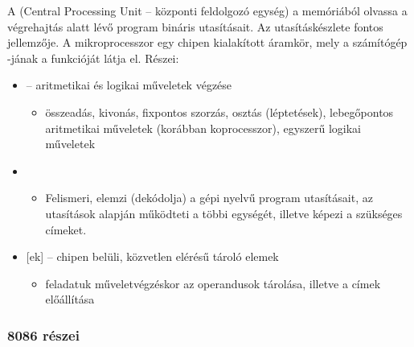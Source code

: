 \documentclass[../main.tex]{subfiles}
\begin{document}
A  (Central Processing Unit -- központi feldolgozó egység) a
memóriából olvassa a végrehajtás alatt lévő program bináris utasításait.
Az utasításkészlete fontos jellemzője. A mikroprocesszor egy chipen kialakított
áramkör, mely a számítógép -jának a funkcióját látja el. Részei:
\begin{itemize}
  \item {} -- aritmetikai és logikai műveletek végzése
        \begin{itemize}
          \item összeadás, kivonás,
                fixpontos szorzás, osztás (léptetések),
                lebegőpontos aritmetikai műveletek (korábban koprocesszor),
                egyszerű logikai műveletek
        \end{itemize}

  \item {}
        \begin{itemize}
          \item Felismeri, elemzi (dekódolja) a gépi nyelvű
                program utasításait, az utasítások alapján működteti
                a  többi egységét, illetve képezi a szükséges címeket.
        \end{itemize}

  \item {}[ek] --
        chipen belüli, közvetlen elérésű tároló elemek
        \begin{itemize}
          \item feladatuk műveletvégzéskor az operandusok tárolása,
                illetve a címek előállítása
        \end{itemize}
\end{itemize}

\subsubsection*{8086 részei}
\end{document}
